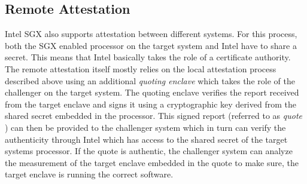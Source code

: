 \subsection{Remote Attestation}
Intel SGX also supports attestation between different systems. For this process, both the SGX enabled processor on the target system and Intel have to share a secret. This means
that Intel basically takes the role of a certificate authority. The remote attestation itself mostly relies on the local attestation process described above using an additional 
\textit{quoting enclave} which takes the role of the challenger on the target system. The quoting enclave verifies the report received from the target enclave and signs it using 
a cryptographic key derived from the shared secret embedded in the processor. This signed report (referred to as \textit{quote} \cite{EnclaveWritersGuide}) can then be provided 
to the challenger system which in turn can verify the authenticity through Intel which has access to the shared secret of the target systems processor. If the quote is authentic, 
the challenger system can analyze the measurement of the target enclave embedded in the quote to make sure, the target enclave is running the correct software.
